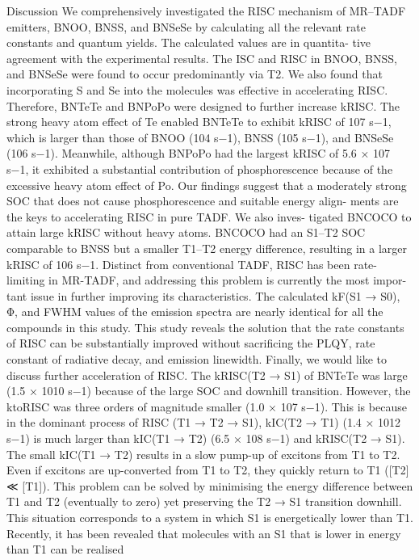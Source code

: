 Discussion
We comprehensively investigated the RISC mechanism of MR–TADF
emitters, BNOO, BNSS, and BNSeSe by calculating all the relevant rate
constants and quantum yields. The calculated values are in quantita-
tive agreement with the experimental results. The ISC and RISC in
BNOO, BNSS, and BNSeSe were found to occur predominantly via T2.
We also found that incorporating S and Se into the molecules was
effective in accelerating RISC. Therefore, BNTeTe and BNPoPo were
designed to further increase kRISC. The strong heavy atom effect of Te
enabled BNTeTe to exhibit kRISC of 107 s−1, which is larger than those of
BNOO (104 s−1), BNSS (105 s−1), and BNSeSe (106 s−1). Meanwhile,
although BNPoPo had the largest kRISC of 5.6 × 107 s−1, it exhibited a
substantial contribution of phosphorescence because of the excessive
heavy atom effect of Po. Our ﬁndings suggest that a moderately strong
SOC that does not cause phosphorescence and suitable energy align-
ments are the keys to accelerating RISC in pure TADF. We also inves-
tigated BNCOCO to attain large kRISC without heavy atoms. BNCOCO
had an S1–T2 SOC comparable to BNSS but a smaller T1–T2 energy
difference, resulting in a larger kRISC of 106 s−1.
Distinct from conventional TADF, RISC has been rate-limiting in
MR-TADF, and addressing this problem is currently the most impor-
tant issue in further improving its characteristics. The calculated
kF(S1 → S0), Φ, and FWHM values of the emission spectra are nearly
identical for all the compounds in this study. This study reveals the
solution that the rate constants of RISC can be substantially improved
without sacriﬁcing the PLQY, rate constant of radiative decay, and
emission linewidth.
Finally, we would like to discuss further acceleration of RISC. The
kRISC(T2 → S1) of BNTeTe was large (1.5 × 1010 s−1) because of the large
SOC and downhill transition. However, the ktoRISC was three orders of
magnitude smaller (1.0 × 107 s−1). This is because in the dominant
process of RISC (T1 → T2 → S1), kIC(T2 → T1) (1.4 × 1012 s−1) is much larger
than kIC(T1 → T2) (6.5 × 108 s−1) and kRISC(T2 → S1). The small kIC(T1 → T2)
results in a slow pump-up of excitons from T1 to T2. Even if excitons
are up-converted from T1 to T2, they quickly return to T1 ([T2] ≪ [T1]).
This problem can be solved by minimising the energy difference
between T1 and T2 (eventually to zero) yet preserving the T2 → S1
transition downhill. This situation corresponds to a system in which S1
is energetically lower than T1. Recently, it has been revealed that
molecules with an S1 that is lower in energy than T1 can be realised
